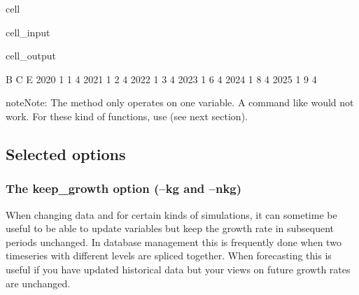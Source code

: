 \documentclass[letterpaper,10pt,english]{jupyterBook}
\begin{document}
\begin{sphinxuseclass}{cell}\begin{sphinxVerbatimInput}

\begin{sphinxuseclass}{cell_input}
\begin{sphinxVerbatim}[commandchars=\\\{\}]
\end{sphinxVerbatim}

\end{sphinxuseclass}\end{sphinxVerbatimInput}
\begin{sphinxVerbatimOutput}

\begin{sphinxuseclass}{cell_output}
\begin{sphinxVerbatim}[commandchars=\\\{\}]
      B  C  E
2020  1  1  4
2021  1  2  4
2022  1  3  4
2023  1  6  4
2024  1  8  4
2025  1  9  4
\end{sphinxVerbatim}

\end{sphinxuseclass}\end{sphinxVerbatimOutput}

\end{sphinxuseclass}
\begin{sphinxadmonition}{note}{Note:}
\sphinxAtStartPar
The method  only operates on one variable.  A command like  would not work. For these kind of functions, use  (see next section).
\end{sphinxadmonition}


\subsection{Selected  options}
\label{\detokenize{content/04_PythonEssentials/UpdateCommand:selected-upd-options}}

\subsubsection{The keep\_growth option (–kg and –nkg)}
\label{\detokenize{content/04_PythonEssentials/UpdateCommand:the-keep-growth-option-kg-and-nkg}}
\sphinxAtStartPar
When changing data and for certain kinds of simulations, it can sometime be useful to be able to update variables but keep the growth rate in subsequent periods unchanged. In database management this is frequently done when two time\sphinxhyphen{}series with different levels are spliced together. When forecasting this is useful if you have updated historical data but your views on future growth rates are unchanged.
\end{document}
